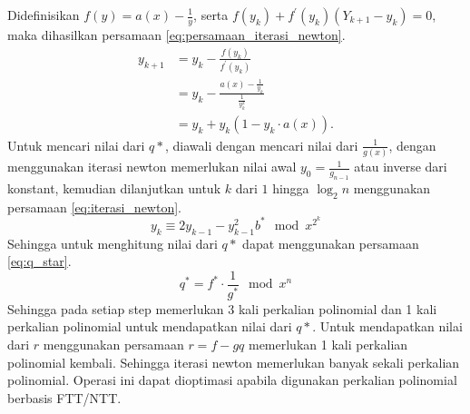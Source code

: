 Didefinisikan $ f(y) = a(x) - \frac{1}{y} $, serta $ f(y_k) + f^{'}(y_k)(Y_{k+1} - y_k) = 0 $, maka dihasilkan persamaan \eqref{eq:persamaan_iterasi_newton}.
\begin{equation}
	\begin{aligned}
		y_{k+1} &= y_k - \frac{f(y_k)}{f^{'}(y_k)} \\
				&= y_k - \frac{a(x) - \frac{1}{y_k}}{\frac{1}{y_k^2}} \\
				&= y_k + y_k(1 - y_k \cdot a(x)).
	\end{aligned}
	\label{eq:persamaan_iterasi_newton}
\end{equation}
Untuk mencari nilai dari $ q* $, diawali dengan mencari nilai dari $ \frac{1}{g(x)} $, dengan menggunakan iterasi newton memerlukan nilai awal $ y_0 = \frac{1}{g_{n-1}} $ atau inverse dari konstant, kemudian dilanjutkan untuk $ k $ dari $ 1 $ hingga $ \log_2 n $ menggunakan persamaan \eqref{eq:iterasi_newton}.
\begin{equation}
	y_k \equiv 2y_{k-1} - y_{k-1}^2 b^* \mod{x^{2^{k}}}
	\label{eq:iterasi_newton}
\end{equation}
Sehingga untuk menghitung nilai dari $ q* $ dapat menggunakan persamaan \eqref{eq:q_star}.
\begin{equation}
	q^* = f^* \cdot \frac{1}{g^*} \mod{x^n}
	\label{eq:q_star}
\end{equation}
Sehingga pada setiap step memerlukan 3 kali perkalian polinomial dan 1 kali perkalian polinomial untuk mendapatkan nilai dari $ q* $. Untuk mendapatkan nilai dari $ r $ menggunakan persamaan $ r = f-gq $ memerlukan 1 kali perkalian polinomial kembali. Sehingga iterasi newton memerlukan banyak sekali perkalian polinomial. Operasi ini dapat dioptimasi apabila digunakan perkalian polinomial berbasis FTT/NTT.


